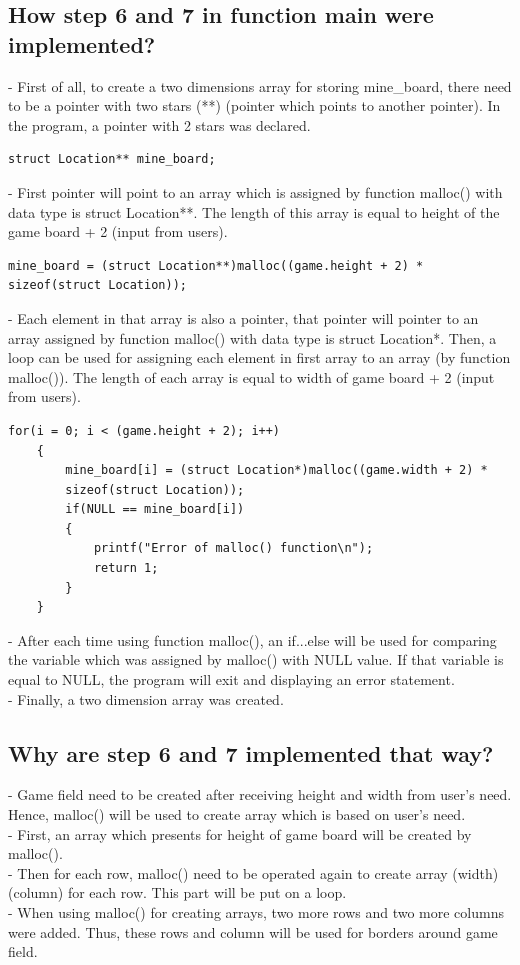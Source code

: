 \documentclass[a4paper,12pt]{article}
\begin{document}
\subsection*{How step 6 and 7 in function main were implemented?}
- First of all, to create a two dimensions array for storing mine\_board, there need to be a pointer with two stars (**) (pointer which points to another pointer). In the program, a pointer with 2 stars was declared.\\
\begin{lstlisting}
struct Location** mine_board;
\end{lstlisting}
- First pointer will point to an array which is assigned by function malloc() with data type is struct Location**. The length of this array is equal to height of the game board + 2 (input from users).\\
\begin{lstlisting}
mine_board = (struct Location**)malloc((game.height + 2) * 
sizeof(struct Location));
\end{lstlisting}
- Each element in that array is also a pointer, that pointer will pointer to an array assigned by function malloc() with data type is struct Location*. Then, a loop can be used for assigning each element in first array to an array (by function malloc()). The length of each array is equal to width of game board + 2 (input from users).\\
\begin{lstlisting}
for(i = 0; i < (game.height + 2); i++)
	{
		mine_board[i] = (struct Location*)malloc((game.width + 2) * 
		sizeof(struct Location));
		if(NULL == mine_board[i])
		{
			printf("Error of malloc() function\n");
			return 1;
		}
	}
\end{lstlisting}
- After each time using function malloc(), an if...else will be used for comparing the variable which was assigned by malloc() with NULL value. If that variable is equal to NULL, the program will exit and displaying an error statement.\\
- Finally, a two dimension array was created.\\
\subsection*{Why are step 6 and 7 implemented that way?}
- Game field need to be created after receiving height and width from user's need. Hence, malloc() will be used to create array which is based on user's need.\\
- First, an array which presents for height of game board will be created by malloc(). \\
- Then for each row, malloc() need to be operated again to create array (width)(column) for each row. This part will be put on a loop.\\ 
- When using malloc() for creating arrays, two more rows and two more columns were added. Thus, these rows and column will be used for borders around game field.\\
\end{document}
